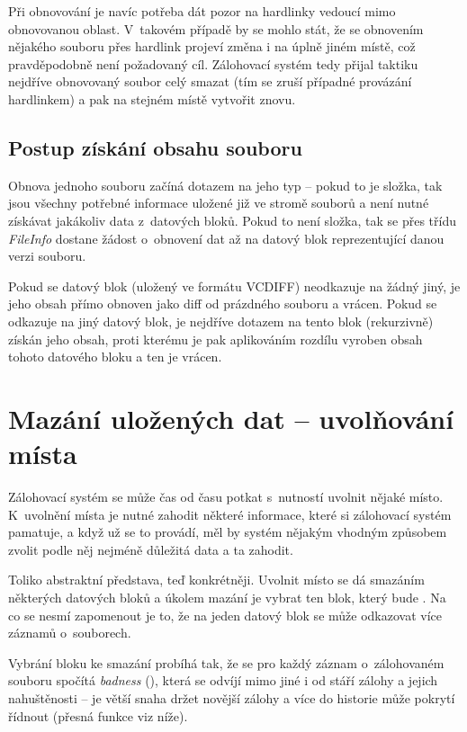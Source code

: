 Při obnovování je navíc potřeba dát pozor na hardlinky vedoucí mimo obnovovanou
oblast. V~takovém případě by se mohlo stát, že se obnovením nějakého souboru
přes hardlink projeví změna i na úplně jiném místě, což pravděpodobně není
požadovaný cíl. Zálohovací systém tedy přijal taktiku nejdříve obnovovaný soubor
celý smazat (tím se zruší případné provázání hardlinkem) a pak na stejném místě
vytvořit znovu.

\subsection{Postup získání obsahu souboru}

Obnova jednoho souboru začíná dotazem na jeho typ -- pokud to je složka, tak
jsou všechny potřebné informace uložené již ve stromě souborů a není nutné
získávat jakákoliv data z~datových bloků. Pokud to není složka, tak se přes
třídu {\it FileInfo} dostane žádost o~obnovení dat až na datový blok
reprezentující danou verzi souboru.

Pokud se datový blok (uložený ve formátu \gls{VCDIFF}) neodkazuje na žádný jiný,
je jeho obsah přímo obnoven jako diff od prázdného souboru a vrácen. Pokud se
odkazuje na jiný datový blok, je nejdříve dotazem na tento blok (rekurzivně)
získán jeho obsah, proti kterému je pak aplikováním rozdílu vyroben obsah tohoto
datového bloku a ten je vrácen.

\section{Mazání uložených dat -- uvolňování místa}

Zálohovací systém se může čas od času potkat s~nutností uvolnit nějaké místo.
K~uvolnění místa je nutné zahodit některé informace, které si zálohovací systém
pamatuje, a když už se to provádí, měl by systém nějakým vhodným způsobem zvolit
podle něj nejméně důležitá data a ta zahodit.

Toliko abstraktní představa, teď konkrétněji. Uvolnit místo se dá smazáním
některých datových bloků a úkolem mazání je vybrat ten blok, který bude
. Na co se nesmí zapomenout je to, že na jeden datový blok
se může odkazovat více záznamů o~souborech.

Vybrání bloku ke smazání probíhá tak, že se pro každý záznam o~zálohovaném
souboru spočítá {\it badness} (), která se odvíjí mimo jiné
i od stáří zálohy a jejich nahuštěnosti -- je větší snaha držet novější zálohy
a více do historie může pokrytí řídnout (přesná funkce viz níže).

